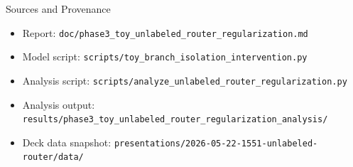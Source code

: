 \documentclass[aspectratio=169]{beamer}
\begin{document}
\begin{frame}{Sources and Provenance}
  \scriptsize
  \begin{itemize}
    \item Report: \texttt{doc/phase3\_toy\_unlabeled\_router\_regularization.md}
    \item Model script: \texttt{scripts/toy\_branch\_isolation\_intervention.py}
    \item Analysis script: \texttt{scripts/analyze\_unlabeled\_router\_regularization.py}
    \item Analysis output: \texttt{results/phase3\_toy\_unlabeled\_router\_regularization\_analysis/}
    \item Deck data snapshot: \texttt{presentations/2026-05-22-1551-unlabeled-router/data/}
  \end{itemize}
\end{frame}
\end{document}
